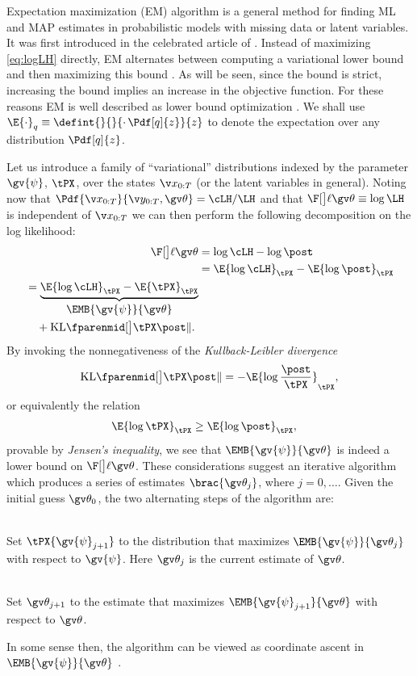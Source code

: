 
Expectation maximization (EM) algorithm is a general
method for finding ML and MAP estimates in probabilistic models with missing data or
latent variables. It was first introduced in
the celebrated article of \textcite{Dempster1977}. Instead of maximizing
\eqref{eq:logLH} directly, EM alternates between computing a variational lower bound and then maximizing this bound
\parencite{Bishop2006,barber2012bayesian}. As will be seen, since the bound is strict, increasing the bound implies
an increase in the objective function. For these reasons EM is well described as lower bound optimization \parencite{Minka1998}.
We shall use $\E{\cdot}_{q}\equiv\defint{}{}{\cdot\,\Pdf[q]{z}}{z}$ to denote the expectation
over any distribution $\Pdf[q]{z}$.

Let us introduce a family of ``variational'' distributions 
indexed by the parameter $\gv{\psi}$, $\tPX$, over the states $\X$ (or the latent variables in general).
Noting now that $\Pdf{\X}{\Y,\Th}=\cLH/\LH$ and that $\lLH\equiv\log\LH$ is independent of $\X$ we can then perform the
following decomposition on the log likelihood:
\begin{align}
	\lLH &= \log\cLH - \log\post \nonumber\\
	&= \E{\log\cLH}_{\tPX} - \E{\log\post}_{\tPX} \nonumber\\ 
	\begin{split}
	&=\underbrace{\E{\log\cLH}_{\tPX} - \E{\tPX}_{\tPX}}_{\displaystyle \EMB{\gv{\psi}}{\Th}}\\
	&\quad+\KL{\tPX}{\post}. 
	\end{split}
	\label{eq:lLH_decomp}
\end{align}
By invoking the nonnegativeness of
the \emph{Kullback-Leibler divergence}
\begin{align}
		\KL{\tPX}{\post} = -\E{\log{\frac{\post}{\tPX}}}_{\tPX},  
\end{align}
or equivalently the relation
\begin{align}
	\E{\log\tPX}_{\tPX} &\geq \E{\log\post}_{\tPX},	
\end{align}
provable by \emph{Jensen's inequality}, 
we see that $\EMB{\gv{\psi}}{\Th}$ is indeed a lower bound on $\lLH$. 
These considerations suggest an iterative algorithm
which produces a series of estimates $\brac{\Th_j}$, where $j=0,\dots$.
Given the initial guess $\Th_0$, the two alternating
steps of the algorithm are:
%
\begin{description}
\addtolength{\leftskip}{1cm}
  \item[E-step]\hfill\\
  Set $\tPX{\gv{\psi}_{j+1}}$ to the distribution that maximizes $\EMB{\gv{\psi}}{\Th_j}$
  with respect to $\gv{\psi}$. Here $\Th_j$ is the current estimate of $\Th$.  
  \item[M-step]\hfill\\ 
  Set $\Th_{j+1}$ to the estimate that maximizes $\EMB{\gv{\psi}_{j+1}}{\Th}$ with respect to $\Th$.
\end{description}%
In some sense then, the algorithm can be viewed as coordinate ascent in $\EMB{\gv{\psi}}{\Th}$ \parencite{Neala1998}. 

